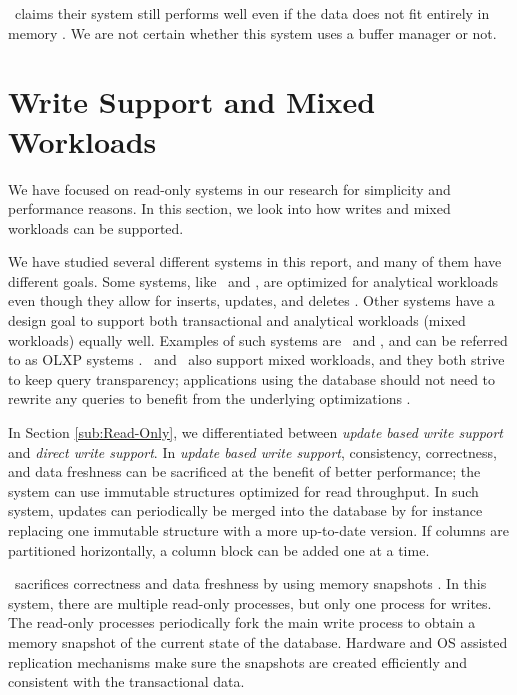 \tableau~claims their system still performs well even if the data does not fit entirely in memory \cite{Kamkolkar2015-iq}. We are not certain whether this system uses a buffer manager or not.


\section{Write Support and Mixed Workloads}
\label{sec:Write Support and Mixed Workloads}

We have focused on read-only systems in our research for simplicity and performance reasons. In this section, we look into how writes and mixed workloads can be supported.


We have studied several different systems in this report, and many of them have different goals. Some systems, like \cstore~and \monetdb, are optimized for analytical workloads even though they allow for inserts, updates, and deletes \cite{Boncz2002-yj, Stonebraker2005-qz}. Other systems have a design goal to support both transactional and analytical workloads (mixed workloads) equally well. Examples of such systems are \hyrise~and \hyper, and can be referred to as OLXP systems \cite{Plattner2014-fr}. \oracle~and \saph~also support mixed workloads, and they both strive to keep query transparency; applications using the database should not need to rewrite any queries to benefit from the underlying optimizations \cite{Farber2012-vh, Lahiri2015-mz}.

In Section \ref{sub:Read-Only}, we differentiated between \textit{update based write support} and \textit{direct write support}. In \textit{update based write support}, consistency, correctness, and data freshness can be sacrificed at the benefit of better performance; the system can use immutable structures optimized for read throughput. In such system, updates can periodically be merged into the database by for instance replacing one immutable structure with a more up-to-date version. If columns are partitioned horizontally, a column block can be added one at a time.

\hyper~sacrifices correctness and data freshness by using memory snapshots \cite{Kemper2011-ap}. In this system, there are multiple read-only processes, but only one process for writes. The read-only processes periodically fork the main write process to obtain a memory snapshot of the current state of the database. Hardware and OS assisted replication mechanisms make sure the snapshots are created efficiently and consistent with the transactional data.

